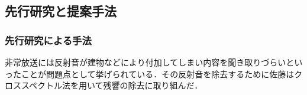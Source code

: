 \documentclass[a4j,11pt]{jsarticle}
\begin{document}

\subsection{先行研究と提案手法}
\subsubsection{先行研究による手法}
非常放送には反射音が建物などにより付加してしまい内容を聞き取りづらいといったことが問題点として挙げられている．その反射音を除去するために佐藤はクロススペクトル法を用いて残響の除去に取り組んだ．
\end{document}
